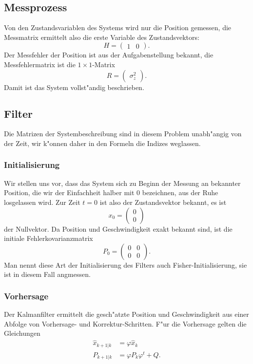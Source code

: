 \subsection{Messprozess}
Von den Zustandsvariablen des Systems wird nur die Position gemessen,
die Messmatrix ermittelt also die erste Variable des Zustandsvektors:
\[
H=\begin{pmatrix}1&0\end{pmatrix}.
\]
Der Messfehler der Position ist aus der Aufgabenstellung bekannt, die
Messfehlermatrix ist die $1\times 1$-Matrix
\[
R=\begin{pmatrix}
\sigma_z^2
\end{pmatrix}.
\]
Damit ist das System vollst"andig beschrieben.

\subsection{Filter}
Die Matrizen der Systembeschreibung sind in diesem Problem unabh"angig
von der Zeit, wir k"onnen daher in den Formeln die Indizes weglassen.

\subsubsection{Initialisierung}
Wir stellen uns vor, dass das System sich zu Beginn der Messung an
bekannter Position, die wir der Einfachheit halber mit $0$ bezeichnen,
aus der Ruhe losgelassen wird.
Zur Zeit $t=0$ ist also der Zustandsvektor bekannt, es ist 
\[
x_0=\begin{pmatrix}0\\0\end{pmatrix}
\]
der Nullvektor.
Da Position und Geschwindigkeit exakt bekannt sind, ist die initiale
Fehlerkovarianzmatrix
\[
P_0=\begin{pmatrix}0&0\\0&0\end{pmatrix}.
\]
Man nennt diese Art der Initialisierung des Filters auch
Fisher-Initialisierung, sie ist in diesem Fall angmessen.

\subsubsection{Vorhersage}
Der Kalmanfilter ermittelt die gesch"atzte Position und Geschwindigkeit aus
einer Abfolge von Vorhersage- und Korrektur-Schritten.
F"ur die Vorhersage gelten die Gleichungen
\begin{align*}
\hat x_{k+1|k}&=\varphi \hat x_k\\
P_{k+1|k}&=\varphi P_k\varphi^t + Q.
\end{align*}

